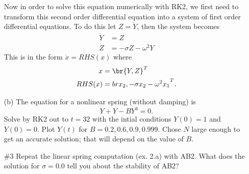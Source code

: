 \documentclass[11pt, oneside]{article}
\begin{document}
\begin{enumerate}
      Now in order to solve this equation numerically with RK2, we first need to
      transform this second order differential equation into a system of first
      order differential equations.
      To do this let $Z = \dot{Y}$, then the system becomes
      \begin{align*}
        \dot{Y} &= Z \\
        \dot{Z} &= -\sigma Z - \omega^2 Y
      \end{align*}
      This is in the form $\dot{x} = RHS(x)$ where
      \begin{align*}
        x &= \br{Y, Z}^T \\
        RHS(x) &= br{x_2, -\sigma x_2 - \omega^2 x_1}^T.
      \end{align*}



    \item[(b)]
      The equation for a nonlinear spring (without damping) is
      \[
        \ddot{Y} + Y - BY^3 = 0.
      \]
      Solve by RK2 out to $t = 32$ with the intial conditions $Y(0) = 1$ and
      $\dot{Y}(0) = 0$.
      Plot $Y(t)$ for $B = 0.2, 0.6, 0.9, 0.999$.
      Chose $N$ large enough to get an accurate solution; that will depend on
      the value of $B$.

  \item[\#3]
    Repeat the linear spring computation (ex. 2.a) with AB2.
    What does the solution for $\sigma=0.0$ tell you about the stability of AB2?
\end{enumerate}
\end{document}
